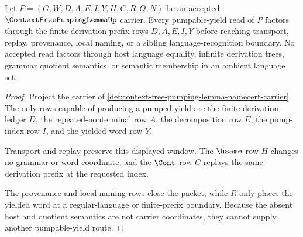 \begin{theorem}
\label{thm:contextfreegrammar-pumping-window-boundary}
Let $P=(G,W,D,A,E,I,Y,H,C,R,Q,N)$ be an accepted $\ContextFreePumpingLemmaUp$ carrier. Every pumpable-yield read of $P$ factors through the finite derivation-prefix rows $D,A,E,I,Y$ before reaching transport, replay, provenance, local naming, or a sibling language-recognition boundary. No accepted read factors through host language equality, infinite derivation trees, grammar quotient semantics, or semantic membership in an ambient language set.
\end{theorem}
\begin{proof}
Project the carrier of \autoref{def:context-free-pumping-lemma-namecert-carrier}. The only rows capable of producing a pumped yield are the finite derivation ledger $D$, the repeated-nonterminal row $A$, the decomposition row $E$, the pump-index row $I$, and the yielded-word row $Y$.

Transport and replay preserve this displayed window. The $\hsame$ row $H$ changes no grammar or word coordinate, and the $\Cont$ row $C$ replays the same derivation prefix at the requested index.

The provenance and local naming rows close the packet, while $R$ only places the yielded word at a regular-language or finite-prefix boundary. Because the absent host and quotient semantics are not carrier coordinates, they cannot supply another pumpable-yield route.
\end{proof}

\begin{closurestatus}{\ContextFreePumpingLemmaUp}
  \theoryclosure{\seedClosure}
  \formalstatus{\theoremCheckedV}
\end{closurestatus}
